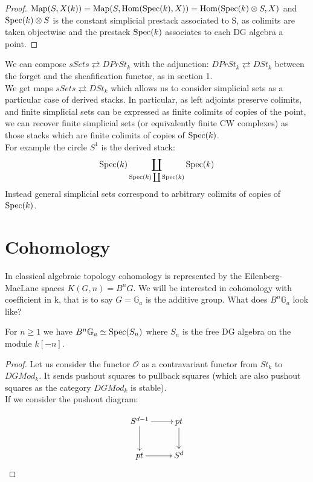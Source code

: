 \begin{refsection}
\begin{proof}
$\operatorname{\mathrm{Map}}(S,X(k))=\operatorname{\mathrm{Map}}(S,\mathrm{Hom}(\mathrm{Spec}(k), X))=\mathrm{Hom}(\mathrm{Spec}(k)\otimes S, X)$ and $\mathrm{Spec}(k)\otimes S$ is the constant simplicial prestack associated to S, as colimits are taken objectwise
and the prestack $\mathrm{Spec}(k)$ associates to each DG algebra a point.
\end{proof}

We can compose $sSets \rightleftarrows DPrSt_k$ with the adjunction: $DPrSt_k\rightleftarrows DSt_k$ between the forget and the sheafification functor, as in section 1.\\
We get maps $sSets \rightleftarrows DSt_k$ which allows us to consider simplicial sets as a particular case of derived stacks.
In particular, as left adjoints preserve colimits, and finite simplicial
sets can be expressed as finite colimits of copies of the point, we can recover finite simplicial sets (or equivalently finite CW complexes) as those stacks 
which are finite colimits of copies
of $\mathrm{Spec}(k)$.\\
For example the circle $S^1$ is the derived stack:
$$\mathrm{Spec}(k)\coprod_{\mathrm{Spec}(k)\coprod \mathrm{Spec}(k)}\mathrm{Spec}(k)$$
Instead general simplicial sets correspond to arbitrary colimits of copies of $\mathrm{Spec}(k)$.\\


\section{Cohomology}

In classical algebraic topology cohomology is represented by the Eilenberg-MacLane spaces $K(G,n)=B^nG$. We will be interested in cohomology with coefficient
in k, that is to say $G=\mathbb G_a$ is the additive group. What does $B^n\mathbb G_a$ look like? 

\begin{prop}
For $n\ge 1$ we have $B^n\mathbb G_a\simeq \mathrm{Spec}(S_n)$ where $S_n$ is the free
DG algebra on the module $k[-n]$.
\end{prop}
\begin{proof}
Let us consider the functor $\mathcal O$ as a contravariant functor from $St_k$ to $DGMod_k$. It sends pushout squares to pullback squares (which are also pushout squares
as the category $DGMod_k$ is stable).\\
If we consider the pushout diagram:


\begin{displaymath}
\xymatrix{
S^{d-1} \ar[r] \ar[d] &  pt \ar[d]\\
 pt \ar[r] & S^d\\
}
\end{displaymath}


\end{proof}
\end{refsection}
